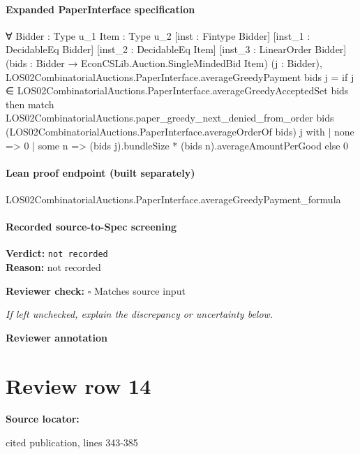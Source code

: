 \documentclass[10pt]{article}
\newcommand{\reviewerbox}{%
  \par\noindent\fbox{\parbox{0.96\linewidth}{\rule{0pt}{0.38in}}}\par
}
\newcommand{\reviewmatch}[1]{%
  \par\noindent\textbf{Reviewer check:} $\square$\; #1\par
  \noindent\emph{If left unchecked, explain the discrepancy or uncertainty below.}\par
}
\begin{document}
\paragraph{Expanded PaperInterface specification}
\begin{ReviewVerbatim}
∀ {Bidder : Type u_1} {Item : Type u_2} [inst : Fintype Bidder] [inst_1 : DecidableEq Bidder]
  [inst_2 : DecidableEq Item] [inst_3 : LinearOrder Bidder] (bids : Bidder → EconCSLib.Auction.SingleMindedBid Item)
  (j : Bidder),
  LOS02CombinatorialAuctions.PaperInterface.averageGreedyPayment bids j =
    if j ∈ LOS02CombinatorialAuctions.PaperInterface.averageGreedyAcceptedSet bids then
      match
        LOS02CombinatorialAuctions.paper_greedy_next_denied_from_order bids
          (LOS02CombinatorialAuctions.PaperInterface.averageOrderOf bids) j with
      | none => 0
      | some n => (bids j).bundleSize * (bids n).averageAmountPerGood
    else 0
\end{ReviewVerbatim}

\paragraph{Lean proof endpoint (built separately)}\begin{ReviewVerbatim}
LOS02CombinatorialAuctions.PaperInterface.averageGreedyPayment_formula
\end{ReviewVerbatim}

\paragraph{Recorded source-to-Spec screening}
\textbf{Verdict:} \texttt{not recorded}
\\
\textbf{Reason:} not recorded
\reviewmatch{Matches source input}
\noindent\textbf{Reviewer annotation}\par
\reviewerbox
\clearpage
\hypertarget{source-claim-58162ce0170b67c7}{}
\section*{Review row 14}
\textbf{Source locator:} {\footnotesize\raggedright cited publication, lines 343-\allowbreak{}385\par}
\end{document}
